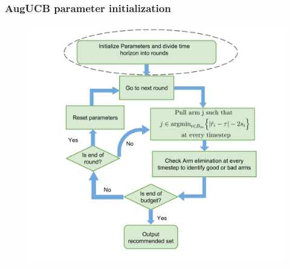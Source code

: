 


\begin{frame}
\frametitle{AugUCB parameter initialization}
\begin{figure}
\includegraphics[scale=0.24]{img/AugUCB_flow_param.png}
\end{figure}
\end{frame}


